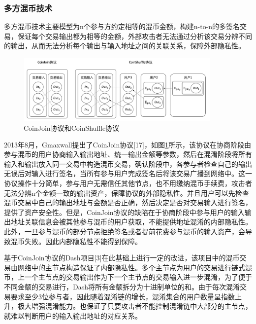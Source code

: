 \subsubsection{多方混币技术}
多方混币技术主要模型为n个参与方约定相等的混币金额，构建n-to-n的多签名交易，保证每个交易输出都为相等的金额，外部攻击者无法通过分析该交易分辨不同的输出，从而无法分析每个输出与输入地址之间的关联关系，保障外部隐私性。

\begin{figure}
\centering
\includegraphics[width=10cm]{figures/coinjoin-shuffle.png}
\caption{CoinJoin协议和CoinShuffle协议}
\label{fig:coinjoin-shuffle}
\end{figure}

2013年8月，Gmaxwall提出了CoinJoin协议[17]，如图\ref{fig:coinjoin-shuffle}所示，该协议在协商阶段由参与混币的用户协商输入输出地址、统一输出金额等参数，然后在混淆阶段将所有输入和输出放入同一交易中构造混币交易，确认阶段中，各参与者检查自己的输出无误后对输入进行签名，当所有参与用户完成签名后将该交易广播到网络中。这一协议操作十分简单，参与用户无需信任其他节点，也不用缴纳混币手续费，攻击者无法分辨n个金额一致的输出资产，保障协议的外部隐私性。并且用户可以先检查混币交易中自己的输出地址与金额是否正确，然后决定是否对交易输入进行签名，提供了资产安全性。但是，CoinJoin协议的缺陷在于协商阶段中参与用户的输入输出地址关联信息会被其他参与混币的用户获取，不能提供地址混淆的内部隐私性。此外，一旦参与混币的部分节点拒绝签名或者提前花费参与混币的输入资产，会导致混币失败。因此内部隐私性不能得到保障。

基于CoinJoin协议的Dash项目[3]在此基础上进行一定的改进，该项目中的混币交易由网络中的主节点构造保证了内部隐私性。多个主节点为用户的交易进行链式混币，上一个主节点的交易输出作为下一个主节点的交易输入进一步混淆，为了便于不同金额的交易进行，Dash将所有金额拆分为十进制单位的和。由于每次混淆交易要求至少3位参与者，因此随着混淆链的增长，混淆集合的用户数量呈指数上升，极大增强混淆能力。也保证了只要攻击者不能控制混淆链中大部分的主节点，就难以判断用户的输入输出地址的对应关系。

